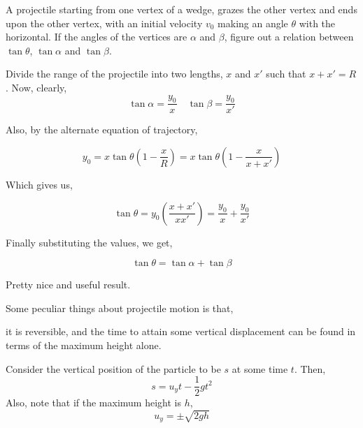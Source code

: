 \begin{example}
    A projectile starting from one vertex of a wedge, grazes the other 
    vertex and ends upon the other vertex, with an initial velocity 
    \(v_0\) making an angle \(\theta\) with the horizontal. If the
    angles of the vertices are \(\alpha\) and \(\beta\), figure 
    out a relation between \(\tan \theta\), \(\tan\alpha\) and \(\tan\beta\).

    \begin{soln}
        Divide the range of the projectile into two lengths, \(x\) and 
        \(x'\) such that \(x + x' = R\). Now, clearly, 
        \begin{equation*}
            \tan\alpha = \frac{y_0}{x} \quad \tan\beta = \frac{y_0}{x'}
        \end{equation*}

        Also, by the alternate equation of trajectory,

        \begin{equation*}
            y_0 = x\tan\theta\left(1 - \frac{x}{R}\right) = x\tan\theta\left(1 - \frac{x}{x + x'}\right) 
        \end{equation*}

        Which gives us, 

        \begin{equation*}
            \tan\theta = y_0 \left(\frac{x + x'}{xx'}\right) = \frac{y_0}{x} + \frac{y_0}{x'}
        \end{equation*}

        Finally substituting the values, we get, 

        \begin{equation}
            \tan\theta = \tan\alpha + \tan\beta
        \end{equation}
        
        Pretty nice and useful result.

    \end{soln}
\end{example}

Some peculiar things about projectile motion is that, \begin{inparaenum}[a)]
    \ii it is reversible, and
    \ii the time to attain some vertical displacement can be found in terms of 
    the maximum height alone.
\end{inparaenum}

Consider the vertical position of the particle to be 
\(s\) at some time \(t\). Then, 
\[s = u_yt - \frac{1}{2}gt^2\] 
Also, note that if the maximum height is \(h\), 
\[u_y = \pm \sqrt{2gh}\]

